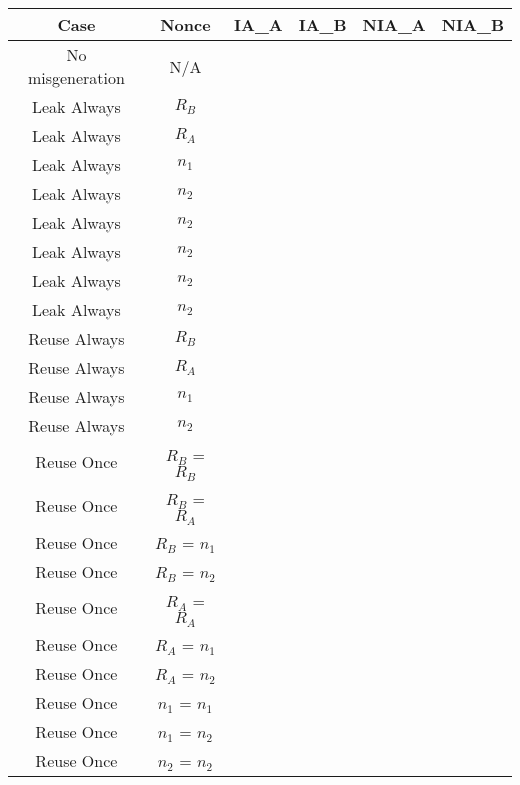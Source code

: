 \documentclass[crop]{standalone}
\newcommand{\noattack}{\color{ForestGreen}\usym{2713}\color{black}}
\newcommand{\attack}{\color{red}\usym{2717}\color{black}}
\begin{document}
\parbox{15cm}{
\begin{tabular}{|c|c|c|c|c|c|}
\hline
Case & Nonce & IA\_A & IA\_B & NIA\_A & NIA\_B \\ \hline
No misgeneration & N/A & \noattack & \noattack & \noattack & \noattack\\ \hline
Leak Always & $R_B$ & \noattack & \noattack & \noattack & \noattack\\ \hline
Leak Always & $R_A$ & \noattack & \noattack & \noattack & \noattack\\ \hline
Leak Always & $n_1$ & \noattack & \noattack & \noattack & \noattack\\ \hline
Leak Always & $n_2$ & \noattack & \noattack & \noattack & \noattack\\ \hline
Leak Always & $n_2$ & \noattack & \noattack & \noattack & \noattack\\ \hline
Leak Always & $n_2$ & \noattack & \noattack & \noattack & \noattack\\ \hline
Leak Always & $n_2$ & \noattack & \noattack & \noattack & \noattack\\ \hline
Leak Always & $n_2$ & \noattack & \noattack & \noattack & \noattack\\ \hline
Reuse Always & $R_B$ & \noattack & \attack & \noattack & \noattack\\ \hline
Reuse Always & $R_A$ & \attack & \noattack & \attack & \noattack\\ \hline
Reuse Always & $n_1$ & \noattack & \noattack & \noattack & \noattack\\ \hline
Reuse Always & $n_2$ & \noattack & \noattack & \noattack & \noattack\\ \hline
Reuse Once & $R_B$ = $R_B$ & \noattack & \attack & \noattack & \noattack\\ \hline
Reuse Once & $R_B$ = $R_A$ & \noattack & \noattack & \noattack & \noattack\\ \hline
Reuse Once & $R_B$ = $n_1$ & \noattack & \noattack & \noattack & \noattack\\ \hline
Reuse Once & $R_B$ = $n_2$ & \noattack & \noattack & \noattack & \noattack\\ \hline
Reuse Once & $R_A$ = $R_A$ & \attack & \noattack & \attack & \noattack\\ \hline
Reuse Once & $R_A$ = $n_1$ & \noattack & \noattack & \noattack & \noattack\\ \hline
Reuse Once & $R_A$ = $n_2$ & \noattack & \noattack & \noattack & \noattack\\ \hline
Reuse Once & $n_1$ = $n_1$ & \noattack & \noattack & \noattack & \noattack\\ \hline
Reuse Once & $n_1$ = $n_2$ & \noattack & \noattack & \noattack & \noattack\\ \hline
Reuse Once & $n_2$ = $n_2$ & \noattack & \noattack & \noattack & \noattack\\ \hline
\end{tabular}}
\end{document}
